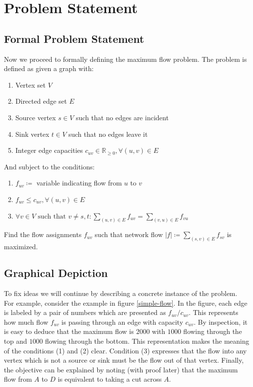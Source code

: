 \documentclass{article}
\begin{document}
\section{Problem Statement}
\subsection{Formal Problem Statement}
\label{formal-problem-statement}
Now we proceed to formally defining the maximum flow problem. The problem is defined as given a graph with: 
\begin{enumerate}
	\item Vertex set $V$
	\item Directed edge set $E$
	\item Source vertex $s\in V$ such that no edges are incident
	\item Sink vertex $t\in V$ such that no edges leave it
	\item Integer edge capacities $c_{uv}\in \mathbb{R}_{\ge 0}, \forall (u,v)\in E$
\end{enumerate}

And subject to the conditions:
\begin{enumerate}
	\item $f_{uv}\coloneqq$ variable indicating flow from $u$ to $v$
	\item  $f_{uv}\le c_{uv},\forall (u,v)\in E$
	\item $\forall v\in V\text{ such that }v\ne s,t:\sum_{(u,v)\in E}f_{uv}=\sum_{(v, u)\in E} f_{vu}$
\end{enumerate}

Find the flow assignments $f_{uv}$ such that network flow $|f|\coloneqq\sum_{(s,v)\in E}f_{sv}$ is maximized.

\subsection{Graphical Depiction}
To fix ideas we will continue by describing a concrete instance of the problem. For example, consider the example in figure \ref{simple-flow}\cite{wiki:fordfulk}. In the figure, each edge is labeled by a pair of numbers which are presented as $f_{uv}/c_{uv}$. This represents how much flow $f_{uv}$ is passing through an edge with capacity $c_{uv}$. By inspection, it is easy to deduce that the maximum flow is $2000$ with $1000$ flowing through the top and $1000$ flowing through the bottom. This representation makes the meaning of the conditions (1) and (2) clear. Condition (3) expresses that the flow into any vertex which is not a source or sink must be the flow out of that vertex. Finally, the objective can be explained by noting (with proof later) that the maximum flow from $A$ to $D$ is equivalent to taking a cut across $A$.
\end{document}
